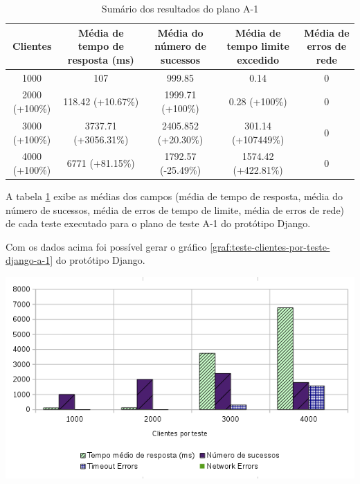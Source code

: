    
  \begin{table}[H]
    \centering
    \footnotesize
    \setlength{\abovecaptionskip}{0pt}
    \setlength{\belowcaptionskip}{0pt}
    \caption[Sumário dos resultados do plano A-1]{Sumário dos resultados do plano A-1	}
    \label{tab:sumario-resultado-plano-teste-a-1}
    \begin{tabular}{c|c|c|c|c}
      \hline \hline
      Clientes  & 	Média de tempo de resposta (ms) &	Média do número de sucessos & 	Média de tempo limite excedido &	Média de erros de rede \\ 
      \hline \hline
      1000 &		107 &					999.85 & 			0.14 &					0 \\
      2000 (+100\%)&	118.42 (+10.67\%) &			1999.71 (+100\%)& 		0.28 (+100\%) &				0 \\
      3000 (+100\%)&	3737.71 (+3056.31\%)&			2405.852 (+20.30\%)& 		301.14 (+107449\%) &			0 \\
      4000 (+100\%)&	6771 (+81.15\%) &			1792.57 (-25.49\%)& 		1574.42 (+422.81\%) &			0 \\
      \hline \hline
    \end{tabular}
  \end{table}
  
  A tabela \ref{tab:sumario-resultado-plano-teste-a-1} exibe as médias dos campos (média de tempo de resposta, 
  média do número de sucessos, média de erros de tempo de limite, média de erros de rede) de cada teste executado 
  para o plano de teste A-1 do protótipo Django.
  
  Com os dados acima foi possível gerar o gráfico \ref{graf:teste-clientes-por-teste-django-a-1} do 
  protótipo Django.
  
  \begin{grafico}[H]
    \setlength{\abovecaptionskip}{5pt}
    \setlength{\belowcaptionskip}{0pt}
    \label{graf:teste-clientes-por-teste-django-a-1}
    \caption[Clientes por teste no Django]
	    {Clientes por teste no Django}
    \centering
    \includegraphics[width=.80\textwidth]{imagem/graficos/grafico_django_plano_de_teste_1.png}
    \captionsetup[grafico]{justification=centering}
  \end{grafico}
  

